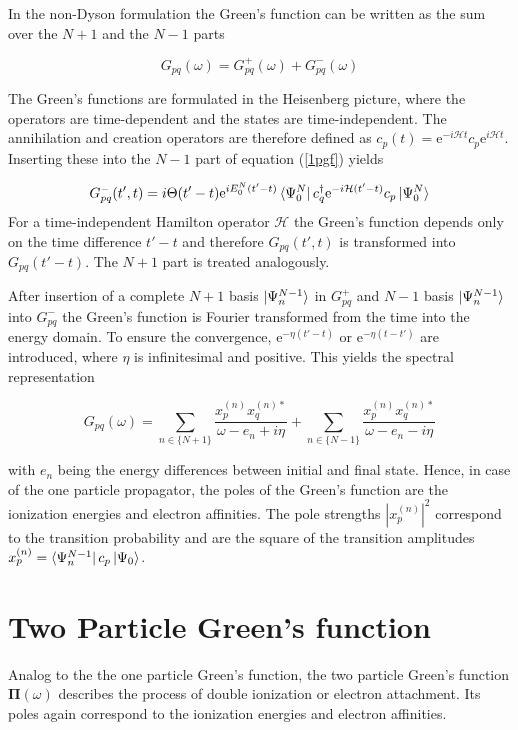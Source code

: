 In the non-Dyson formulation \cite{Schirmer89} the Green's function can be
written as the sum over the $N+1$ and the $N-1$ parts

\begin{equation}
G_{pq}(\omega) = G_{pq}^+(\omega) + G_{pq}^-(\omega)
\end{equation}

The Green's functions are formulated in the Heisenberg picture, where the
operators are time-dependent and the states are time-independent.
The annihilation and creation operators are therefore defined as
$c_p(t) = \mathrm{e}^{-i\mathcal{H} t} c_p \mathrm{e}^{i\mathcal{H} t}$.
Inserting these into the $N-1$ part of equation (\ref{1pgf}) yields


\begin{equation}\label{g-hsb}
G_{pq}^-(t',t) = i\Theta(t'-t) \mathrm{e}^{iE_0^N(t'-t)}\bra{\Psi_0^N}c_q^\dagger\mathrm{e}^{-i\mathcal{H}(t'-t)}c_p\ket{\Psi_0^N}
\end{equation}
For a time-independent Hamilton operator $\mathcal{H}$ the Green's function
depends only on the time difference $t'-t$ and therefore $G_{pq}(t',t)$ is
transformed into $G_{pq}(t'-t)$. The $N+1$ part is treated analogously.

After insertion of a complete $N+1$ basis $\ket{\Psi_n^{N-1}}$ in
$G_{pq}^+$ and $N-1$ basis $\ket{\Psi_n^{N-1}}$
into $G_{pq}^-$ the Green's function is Fourier transformed from the time
into the energy domain. To ensure the convergence, 
$\mathrm{e}^{-\eta(t'-t)}$ or $\mathrm{e}^{-\eta(t-t')}$ are introduced,
where $\eta$ is infinitesimal and positive.
This yields the spectral representation

\begin{equation}\label{spektraldst}
G_{pq}(\omega) = \sum\limits_{n\in\{N+1\}}\frac{x_p^{(n)}x_q^{(n)*}}{\omega-e_n +i\eta} + \sum\limits_{n\in\{N-1\}}\frac{x_p^{(n)}x_q^{(n)*}}{\omega-e_n -i\eta}
\end{equation}

with $e_n$ being the energy differences between initial and final state. Hence,
in case of the one particle propagator, the poles of the Green's function
are the ionization energies and electron affinities.
The pole strengths $\left|x_p^{(n)}\right|^2$ correspond to the transition
probability and are the square of the transition amplitudes
$x_p^{(n)}=\bra{\Psi_n^{N-1}}c_p\ket{\Psi_0}$.



\section{Two Particle Green's function}
Analog to the the one particle Green's function, the two particle Green's
function $\mathbf{\Pi}(\omega)$ describes the process of double ionization
or electron attachment. Its poles again correspond to the ionization energies
and electron affinities.

